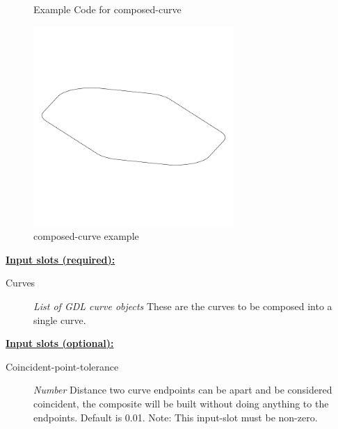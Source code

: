 \documentclass [11pt]{book}
\begin{document}
\begin{itemize}
\begin{figure}
\caption{Example Code for composed-curve}

\label{fig:example-code-composed-curve}

\end{figure}

\begin{figure}
\begin{center}
\includegraphics[width=3in,height=3in]{../images/example-composed-curve.pdf}
\end{center}

\caption{composed-curve example}

\label{fig:composed-curve}

\end{figure}





\textbf{
\underline{Input slots (required):}}

\begin{description}

\item [Curves]
\emph{List of GDL curve objects} These are the curves to be composed into a single curve.


\end{description}






\textbf{
\underline{Input slots (optional):}}

\begin{description}

\item [Coincident-point-tolerance]
\emph{Number} Distance two curve endpoints can be apart and be considered coincident, the composite will be built
without doing anything to the endpoints. Default is 0.01. Note: This input-slot must be non-zero.



\end{description}
\end{itemize}
\end{document}

